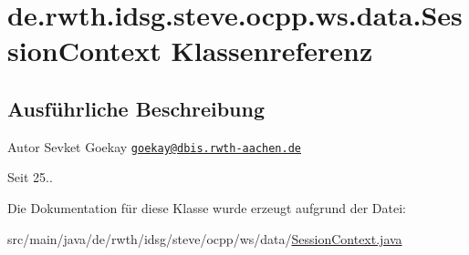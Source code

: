 \hypertarget{classde_1_1rwth_1_1idsg_1_1steve_1_1ocpp_1_1ws_1_1data_1_1_session_context}{\section{de.\+rwth.\+idsg.\+steve.\+ocpp.\+ws.\+data.\+Session\+Context Klassenreferenz}
\label{classde_1_1rwth_1_1idsg_1_1steve_1_1ocpp_1_1ws_1_1data_1_1_session_context}
}


\subsection{Ausführliche Beschreibung}
\begin{DoxyAuthor}{Autor}
Sevket Goekay \href{mailto:goekay@dbis.rwth-aachen.de}{\tt goekay@dbis.\+rwth-\/aachen.\+de} 
\end{DoxyAuthor}
\begin{DoxySince}{Seit}
25.. 
\end{DoxySince}


Die Dokumentation für diese Klasse wurde erzeugt aufgrund der Datei\+:\begin{DoxyCompactItemize}
\item 
src/main/java/de/rwth/idsg/steve/ocpp/ws/data/\hyperlink{_session_context_8java}{Session\+Context.\+java}\end{DoxyCompactItemize}
